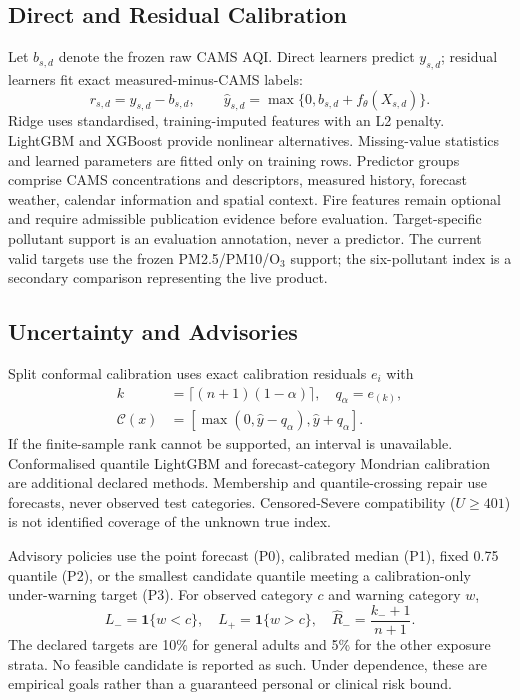 \documentclass[journal]{IEEEtran}
\begin{document}
\subsection{Direct and Residual Calibration}
Let $b_{s,d}$ denote the frozen raw CAMS AQI. Direct learners predict $y_{s,d}$;
residual learners fit exact measured-minus-CAMS labels:
\begin{equation}
r_{s,d}=y_{s,d}-b_{s,d},\qquad
\widehat y_{s,d}=\max\{0,b_{s,d}+f_\theta(X_{s,d})\}.\label{eq:residual}
\end{equation}
Ridge uses standardised, training-imputed features with an L2 penalty.
LightGBM and XGBoost provide nonlinear alternatives. Missing-value statistics
and learned parameters are fitted only on training rows. Predictor groups
comprise CAMS concentrations and descriptors, measured history, forecast
weather, calendar information and spatial context. Fire features remain
optional and require admissible publication evidence before evaluation.
Target-specific pollutant support is an evaluation annotation, never a predictor.
The current valid targets use the frozen PM2.5/PM10/O$_3$ support; the
six-pollutant index is a secondary comparison representing the live product.

\subsection{Uncertainty and Advisories}
Split conformal calibration uses exact calibration residuals $e_i$ with
\begin{equation}
\begin{aligned}
k&=\lceil(n+1)(1-\alpha)\rceil,\quad q_\alpha=e_{(k)},\\
\mathcal C(x)&=[\max(0,\widehat y-q_\alpha),\widehat y+q_\alpha].
\end{aligned}
\label{eq:conformal}
\end{equation}
If the finite-sample rank cannot be supported, an interval is unavailable.
Conformalised quantile LightGBM and forecast-category Mondrian calibration
are additional declared methods. Membership and quantile-crossing repair use
forecasts, never observed test categories. Censored-Severe compatibility
($U\geq401$) is not identified coverage of the unknown true index.

Advisory policies use the point forecast (P0), calibrated median (P1), fixed
0.75 quantile (P2), or the smallest candidate quantile meeting a calibration-only
under-warning target (P3). For observed category $c$ and warning category $w$,
\begin{equation}
L_-=\mathbf1\{w<c\},\quad L_+=\mathbf1\{w>c\},\quad
\widehat R_-=\frac{k_-+1}{n+1}.\label{eq:warning}
\end{equation}
The declared targets are 10\% for general adults and 5\% for the other exposure
strata. No feasible candidate is reported as such. Under dependence, these
are empirical goals rather than a guaranteed personal or clinical risk bound.
\end{document}
